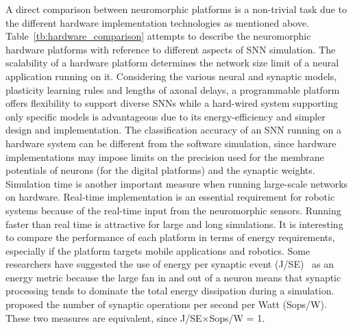A direct comparison between neuromorphic platforms is a non-trivial task due to the different hardware implementation technologies as mentioned above.
Table~\ref{tb:hardware_comparison} attempts to describe the neuromorphic hardware platforms with reference to different aspects of SNN simulation.
The scalability of a hardware platform determines the network size limit of a neural application running on it.
Considering the various neural and synaptic models, plasticity learning rules and lengths of axonal delays, a programmable platform offers flexibility to support diverse SNNs while a hard-wired system supporting only specific models is advantageous due to its energy-efficiency and simpler design and implementation.
The classification accuracy of an SNN running on a hardware system can be different from the software simulation, since hardware implementations may impose limits on the precision used for the membrane potentials of neurons (for the digital platforms) and the synaptic weights.
Simulation time is another important measure when running large-scale networks on hardware.
Real-time implementation is an essential requirement for robotic systems because of the real-time input from the neuromorphic sensors.
Running faster than real time is attractive for large and long simulations.
It is interesting to compare the performance of each platform in terms of energy requirements, especially if the platform targets mobile applications and robotics.
Some researchers have suggested the use of energy per synaptic event (J/SE)~\cite{sharp2012power,stromatias2013power} as an energy metric because the large fan in and out of a neuron means that synaptic processing tends to dominate the total energy dissipation during a simulation.
\cite{merolla2014million} proposed the number of synaptic operations per second per Watt (Sops/W).
These two measures are equivalent, since J/SE$\times$Sops/W = 1.

